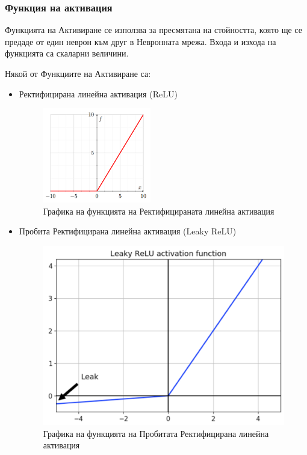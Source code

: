 \documentclass{article}
\begin{document}
\subsubsection{Функция на активация}

Функцията на Активиране се използва за пресмятана на стойността, която ще се предаде от един неврон към друг в
Невронната мрежа. Входа и изхода на функцията са скаларни величини. \cite{deep-learning-practitioner}

Някой от Функциите на Активиране са:

\begin{itemize}
  \item Ректифицирана линейна активация (ReLU)

    \begin{figure}[H]
      \centering
      \captionsetup{justification=centering}
      \includegraphics{chapter-03/relu.png}
      \caption{Графика на функцията на Ректифицираната линейна активация}
    \end{figure}

  \item Пробита Ректифицирана линейна активация (Leaky ReLU)

    \begin{figure}[H]
      \centering
      \captionsetup{justification=centering}
      \includegraphics{chapter-03/leaky-relu.png}
      \caption{Графика на функцията на Пробитата Ректифицирана линейна активация}
    \end{figure}


\end{itemize}
\end{document}
